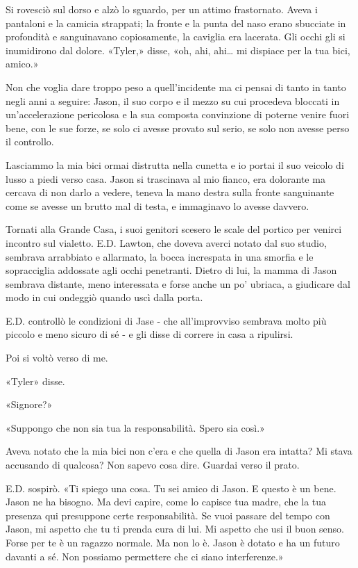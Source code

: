 Si rovesciò sul dorso e alzò lo sguardo, per un attimo frastornato.
Aveva i pantaloni e la camicia strappati; la fronte e la punta del naso
erano sbucciate in profondità e sanguinavano copiosamente, la caviglia
era lacerata. Gli occhi gli si inumidirono dal dolore. «Tyler,» disse,
«oh, ahi, ahi\ldots{} mi dispiace per la tua bici, amico.»

Non che voglia dare troppo peso a quell'incidente ma ci pensai di tanto
in tanto negli anni a seguire: Jason, il suo corpo e il mezzo su cui
procedeva bloccati in un'accelerazione pericolosa e la sua composta
convinzione di poterne venire fuori bene, con le sue forze, se solo ci
avesse provato sul serio, se solo non avesse perso il controllo.

\separatorefiori

Lasciammo la mia bici ormai distrutta nella cunetta e io portai il suo
veicolo di lusso a piedi verso casa. Jason si trascinava al mio fianco,
era dolorante ma cercava di non darlo a vedere, teneva la mano destra
sulla fronte sanguinante come se avesse un brutto mal di testa, e
immaginavo lo avesse davvero.

Tornati alla Grande Casa, i suoi genitori scesero le scale del portico
per venirci incontro sul vialetto. E.D. Lawton, che doveva averci notato
dal suo studio, sembrava arrabbiato e allarmato, la bocca increspata in
una smorfia e le sopracciglia addossate agli occhi penetranti. Dietro di
lui, la mamma di Jason sembrava distante, meno interessata e forse anche
un po' ubriaca, a giudicare dal modo in cui ondeggiò quando uscì dalla
porta.

E.D. controllò le condizioni di Jase - che all'improvviso sembrava molto
più piccolo e meno sicuro di sé - e gli disse di correre in casa a
ripulirsi.

Poi si voltò verso di me.

«Tyler» disse.

«Signore?»

«Suppongo che non sia tua la responsabilità. Spero sia così.»

Aveva notato che la mia bici non c'era e che quella di Jason era
intatta? Mi stava accusando di qualcosa? Non sapevo cosa dire. Guardai
verso il prato.

E.D. sospirò. «Ti spiego una cosa. Tu sei amico di Jason. E questo è un
bene. Jason ne ha bisogno. Ma devi capire, come lo capisce tua madre,
che la tua presenza qui presuppone certe responsabilità. Se vuoi passare
del tempo con Jason, mi aspetto che tu ti prenda cura di lui. Mi aspetto
che usi il buon senso. Forse per te è un ragazzo normale. Ma non lo è.
Jason è dotato e ha un futuro davanti a sé. Non possiamo permettere che
ci siano interferenze.»

